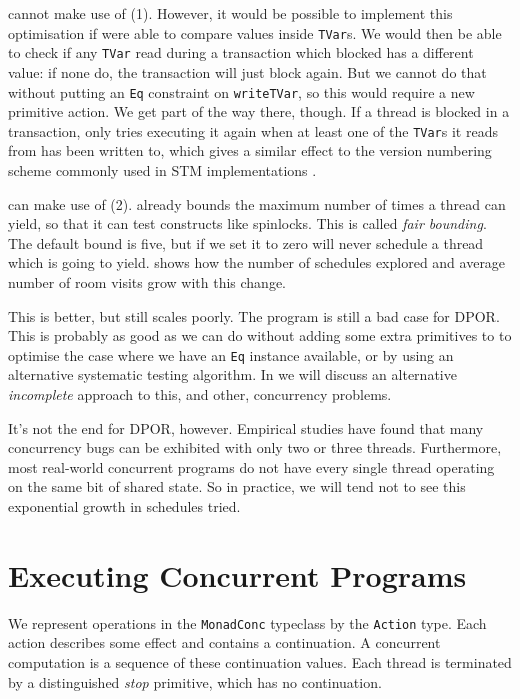 \dejafu{} cannot make use of (1).  However, it would be possible to
implement this optimisation if \dejafu{} were able to compare values
inside \verb|TVar|s.  We would then be able to check if any
\verb|TVar| read during a transaction which blocked has a different
value: if none do, the transaction will just block again.  But we
cannot do that without putting an \verb|Eq| constraint on
\verb|writeTVar|, so this would require a new primitive action.  We
get part of the way there, though.  If a thread is blocked in a
transaction, \dejafu{} only tries executing it again when at least one
of the \verb|TVar|s it reads from has been written to, which gives a
similar effect to the version numbering scheme commonly used in STM
implementations \parencite{shavit1995}.

\dejafu{} can make use of (2).  \dejafu{} already bounds the maximum
number of times a thread can yield, so that it can test constructs
like spinlocks.  This is called \emph{fair bounding}.  The default
bound is five, but if we set it to zero \dejafu{} will never schedule
a thread which is going to yield.   shows how the
number of schedules explored and average number of room visits grow
with this change.

This is better, but still scales poorly.  The program is still a bad
case for DPOR.  This is probably as good as we can do without adding
some extra primitives to \dejafu{} to optimise the case where we have
an \verb|Eq| instance available, or by using an alternative systematic
testing algorithm.  In  we will discuss an
alternative \emph{incomplete} approach to this, and other, concurrency
problems.

It's not the end for DPOR, however.  Empirical
studies \parencite{thomson2014} have found that many concurrency bugs can be
exhibited with only two or three threads.  Furthermore, most
real-world concurrent programs do not have every single thread
operating on the same bit of shared state.  So in practice, we will
tend not to see this exponential growth in schedules tried.

\section{Executing Concurrent Programs}
\label{sec:dejafu-execution}

We represent operations in the \verb|MonadConc| typeclass by the
\verb|Action| type.  Each action describes some effect and contains a
continuation.  A concurrent computation is a sequence of these
continuation values.  Each thread is terminated by a distinguished
\emph{stop} primitive, which has no continuation.

